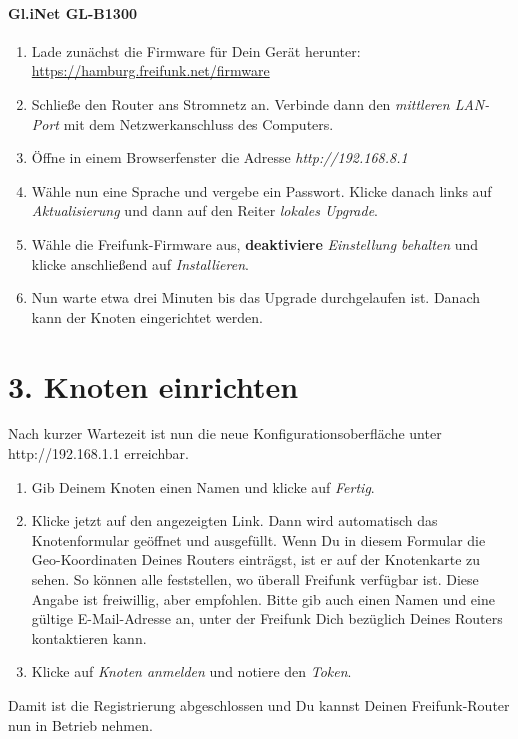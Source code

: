 \documentclass[10pt,a4paper,notumble]{leaflet}
\begin{document}
\paragraph{Gl.iNet GL-B1300}
\begin{enumerate}
 \item Lade zunächst die Firmware für Dein Gerät herunter: \href{https://hamburg.freifunk.net/firmware}{https://hamburg.freifunk.net/firmware}
 \item Schließe den Router ans Stromnetz an. Verbinde dann den \textit{mittleren LAN-Port} mit dem Netzwerkanschluss des Computers.
 \item Öffne in einem Browserfenster die Adresse \textit{http://192.168.8.1}
 \item Wähle nun eine Sprache und vergebe ein Passwort. Klicke danach links auf \textit{Aktualisierung} und dann auf den Reiter \textit{lokales Upgrade}.
 \item Wähle die Freifunk-Firmware aus, \textbf{deaktiviere} \textit{Einstellung behalten} und klicke anschließend auf \textit{Installieren}.
 \item Nun warte etwa drei Minuten bis das Upgrade durchgelaufen ist. Danach kann der Knoten eingerichtet werden.
\end{enumerate}


\newpage

\section{3. Knoten einrichten}
Nach kurzer Wartezeit ist nun die neue Konfigurationsoberfläche unter http://192.168.1.1 erreichbar.

\begin{enumerate}
 \item Gib Deinem Knoten einen Namen und klicke auf \textit{Fertig}.
 \item Klicke jetzt auf den angezeigten Link. Dann wird automatisch das Knotenformular geöffnet und ausgefüllt. Wenn Du in diesem Formular die Geo-Koordinaten Deines Routers einträgst, ist er auf der Knotenkarte zu sehen. So können alle feststellen, wo überall Freifunk verfügbar ist. Diese Angabe ist freiwillig, aber empfohlen. Bitte gib auch einen Namen und eine gültige E-Mail-Adresse an, unter der Freifunk Dich bezüglich Deines Routers kontaktieren kann.
 \item Klicke auf \textit{Knoten anmelden} und notiere den \textit{Token}.
\end{enumerate}
Damit ist die Registrierung abgeschlossen und Du kannst Deinen Freifunk-Router nun in Betrieb nehmen.
\end{document}
